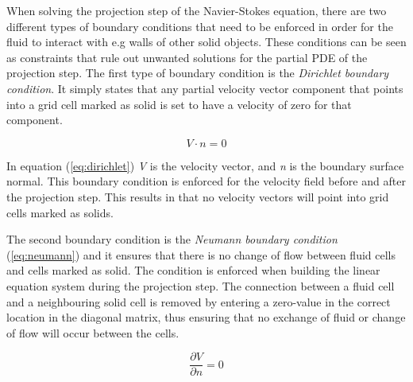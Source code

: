When solving the projection step of the Navier-Stokes equation, there are two different types of boundary conditions that need to be enforced in order for the fluid to interact with e.g walls of other solid objects. These conditions can be seen as constraints that rule out unwanted solutions for the partial PDE of the projection step. The first type of boundary condition is the \emph{Dirichlet boundary condition}. It simply states that any partial velocity vector component that points into a grid cell marked as solid is set to have a velocity of zero for that component.

\begin{equation}
\label{eq:dirichlet}
V \cdot n = 0
\end{equation}

In equation (\ref{eq:dirichlet}) \emph{V} is the velocity vector, and \emph{n} is the boundary surface normal. This boundary condition is enforced for the velocity field before and after the projection step. This results in that no velocity vectors will point into grid cells marked as solids.

The second boundary condition is the \emph{Neumann boundary condition} (\ref{eq:neumann}) and it ensures that there is no change of flow between fluid cells and cells marked as solid. The condition is enforced when building the linear equation system during the projection step. The connection between a fluid cell and a neighbouring solid cell is removed by entering a zero-value in the correct location in the diagonal matrix, thus ensuring that no exchange of fluid or change of flow will occur between the cells.

\begin{equation}
\label{eq:neumann}
\frac{\partial V}{\partial n} = 0
\end{equation}